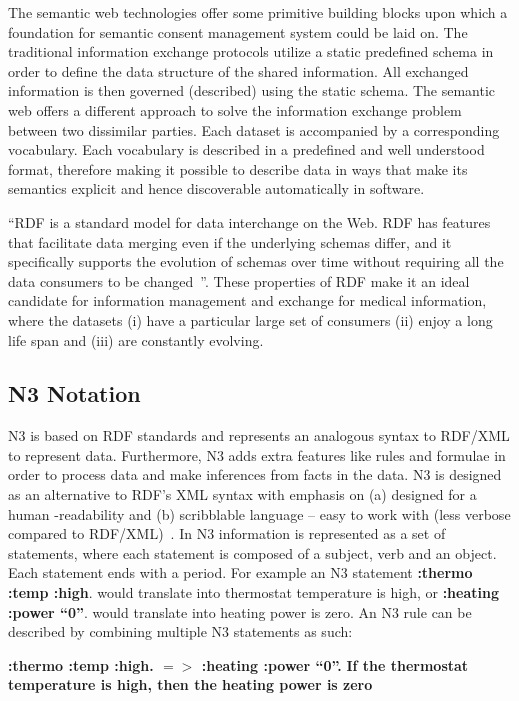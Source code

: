 \documentclass[conference]{IEEEtran}
\begin{document}
The semantic web technologies offer some primitive building blocks upon which a foundation for semantic consent management system could be laid on.  The
traditional information exchange protocols utilize a static predefined schema in order to define the data structure of the shared information. All exchanged
information is then governed (described) using the static schema.  The semantic web offers a different approach to solve the information exchange problem
between two dissimilar parties.  Each dataset is accompanied by a corresponding vocabulary.  Each vocabulary is described in a predefined and well understood
format, therefore making it possible to describe data in ways that make its semantics explicit and hence discoverable automatically in software.

“RDF is a standard model for data interchange on the Web. RDF has features that facilitate data merging even if the underlying schemas differ, and it
specifically supports the evolution of schemas over time without requiring all the data consumers to be changed~\cite{rdfsite}”.  These properties of RDF make
it an ideal candidate for information management and exchange for medical information, where the datasets (i) have a particular large set of consumers (ii)
enjoy a long life span and (iii) are constantly evolving.

\subsection{N3 Notation}

N3 is based on RDF standards and represents an analogous syntax to RDF/XML to represent data.  Furthermore, N3 adds extra features like rules and formulae in
order to process data and make inferences from facts in the data.  N3 is designed as an alternative to RDF's XML syntax with emphasis on (a) designed for a
human -readability and (b) scribblable language – easy to work with (less verbose compared to RDF/XML)~\cite{notation3}.  In N3 information is represented as a
set of statements, where each statement is composed of a subject, verb and an object. Each statement ends with a period.
For example an N3 statement \textbf{{:thermo :temp :high}}. would translate into thermostat temperature is high, or \textbf{{:heating :power “0”}}. would
translate into heating power is zero.  An N3 rule can be described by combining multiple N3 statements as such:

\textbf{{:thermo :temp :high}. $=>$ {:heating :power “0”}.}\newline
\textbf{If the thermostat temperature is high, then the heating power is zero}
\end{document}
